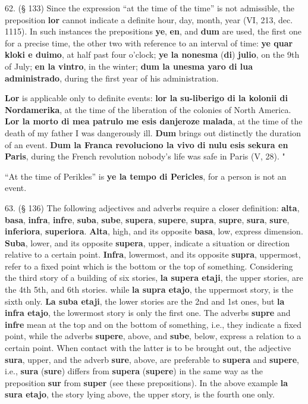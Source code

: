 62. (§ 133) Since the expression ``at the time of the time'' is not admissible, the preposition \textbf{lor} cannot indicate a definite hour, day, month, year (VI, 213, dec. 1115). In such instances the prepositions \textbf{ye}, \textbf{en}, and \textbf{dum} are used, the first one for a precise time, the other two with reference to an interval of time: \textbf{ye quar kloki e duimo}, at half past four o'clock; \textbf{ye la nonesma }(\textbf{di})\textbf{ julio}, on the 9th of July; \textbf{en la vintro}, in the winter; \textbf{dum la unesma yaro di lua administrado}, during the first year of his administration. %

\textbf{Lor} is applicable only to definite events: \textbf{lor la su-liberigo di la kolonii di Nordamerika}, at the time of the liberation of the colonies of North America. \textbf{Lor la morto di mea patrulo me esis danjeroze malada}, at the time of the death of my father I was dangerously ill. \textbf{Dum} brings out distinctly the duration of an event. \textbf{Dum la Franca revoluciono la vivo di nulu esis sekura en Paris}, during the French revolution nobody's life was safe in Paris (V, 28). "

``At the time of Perikles'' is \textbf{ye la tempo di Pericles}, for a person is not an event.

63. (§ 136) The following adjectives and adverbs require a closer definition: \textbf{alta}, \textbf{basa}, \textbf{infra}, \textbf{infre}, \textbf{suba}, \textbf{sube}, \textbf{supera}, \textbf{supere}, \textbf{supra}, \textbf{supre}, \textbf{sura}, \textbf{sure}, \textbf{inferiora}, \textbf{superiora}. \textbf{Alta}, high, and its opposite \textbf{basa}, low, express dimension. \textbf{Suba}, lower, and its opposite \textbf{supera}, upper, indicate a situation or direction relative to a certain point. \textbf{Infra}, lowermost, and its opposite \textbf{supra}, uppermost, refer to a fixed point which is the bottom or the top of something. Considering the third story of a building of six stories, \textbf{la supera etaji}, the upper stories, are the 4th 5th, and 6th stories. while \textbf{la supra etajo}, the uppermost story, is the sixth only. \textbf{La suba etaji}, the lower stories are the 2nd and 1st ones, but \textbf{la infra etajo}, the lowermost story is only the first one. The adverbs \textbf{supre} and \textbf{infre} mean at the top and on the bottom of something, i.e., they indicate a fixed point, while the adverbs \textbf{supere}, above, and \textbf{sube}, below, express a relation to a certain point. When contact with the latter is to be brought out, the adjective \textbf{sura}, upper, and the adverb \textbf{sure}, above, are preferable to \textbf{supera} and \textbf{supere}, i.e., \textbf{sura} (\textbf{sure}) differs from \textbf{supera} (\textbf{supere}) in the same way as the preposition \textbf{sur} from \textbf{super} (see these prepositions). In the above example \textbf{la sura etajo}, the story lying above, the upper story, is the fourth one only. %

